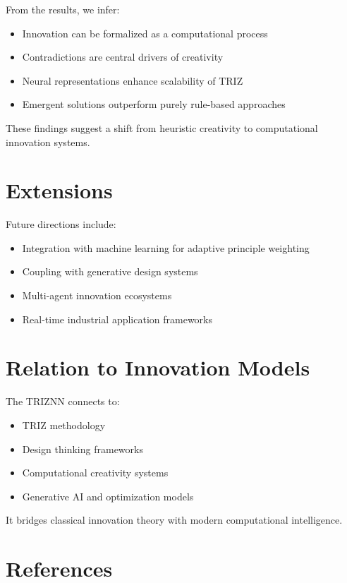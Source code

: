 \documentclass[12pt]{article}
\begin{document}
From the results, we infer:

\begin{itemize}
\item Innovation can be formalized as a computational process
\item Contradictions are central drivers of creativity
\item Neural representations enhance scalability of TRIZ
\item Emergent solutions outperform purely rule-based approaches
\end{itemize}

These findings suggest a shift from heuristic creativity to computational innovation systems.

\section{Extensions}

Future directions include:

\begin{itemize}
\item Integration with machine learning for adaptive principle weighting
\item Coupling with generative design systems
\item Multi-agent innovation ecosystems
\item Real-time industrial application frameworks
\end{itemize}

\section{Relation to Innovation Models}

The TRIZNN connects to:

\begin{itemize}
\item TRIZ methodology
\item Design thinking frameworks
\item Computational creativity systems
\item Generative AI and optimization models
\end{itemize}

It bridges classical innovation theory with modern computational intelligence.

\section{References}
\end{document}
